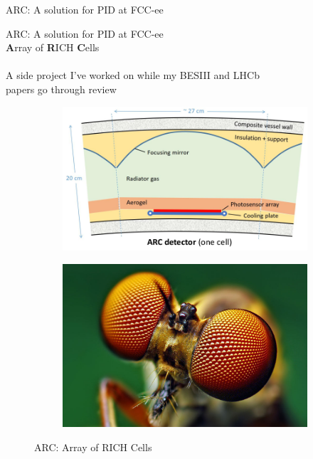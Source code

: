 \documentclass{beamer}
\begin{document}
\begin{frame}{ARC: A solution for PID at FCC-ee}
  \begin{center}
    \huge ARC: A solution for PID at FCC-ee\\
    \Large\textbf{A}rray of \textbf{R}ICH \textbf{C}ells\\~\\
    \large A side project I've worked on while my BESIII and LHCb\\papers go through review
  \end{center}
  \begin{figure}
    \centering
    \begin{subfigure}{0.4\textwidth}
      \includegraphics[width = 1.0\textwidth]{Plots/ARC_Cell.png}
    \end{subfigure}%
    \hspace{1cm}
    \begin{subfigure}{0.3\textwidth}
      \includegraphics[width = 1.0\textwidth]{Plots/CompoundEyes.jpg}
    \end{subfigure}
    \caption{ARC: Array of RICH Cells}
  \end{figure}
\end{frame}
\end{document}
